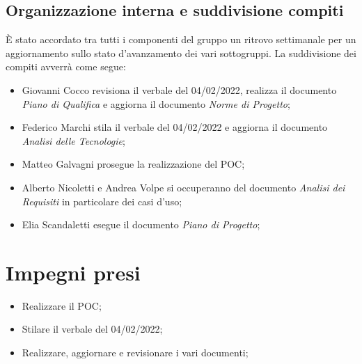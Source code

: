 \documentclass[a4paper, 12pt]{article}
\begin{document}
\subsection{Organizzazione interna e suddivisione compiti}
È stato accordato tra tutti i componenti del gruppo un ritrovo settimanale per un aggiornamento sullo stato d'avanzamento dei vari sottogruppi. La suddivisione dei compiti avverrà come segue:
\begin{itemize}
    \item Giovanni Cocco revisiona il verbale del 04/02/2022, realizza il documento \textit{Piano di Qualifica} e aggiorna il documento \textit{Norme di Progetto};
    \item Federico Marchi stila il verbale del 04/02/2022 e aggiorna il documento \textit{Analisi delle Tecnologie};
    \item Matteo Galvagni prosegue la realizzazione del POC;
    \item Alberto Nicoletti e Andrea Volpe si occuperanno del documento \textit{Analisi dei Requisiti} in particolare dei casi d'uso;
    \item Elia Scandaletti esegue il documento \textit{Piano di Progetto};
\end{itemize}

\section{Impegni presi}
\begin{itemize}
\item Realizzare il POC;
\item Stilare il verbale del 04/02/2022;
\item Realizzare, aggiornare e revisionare i vari documenti;
\end{itemize}
\end{document}
